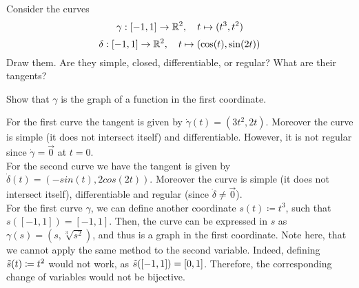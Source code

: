 \documentclass[11pt]{article}
\begin{document}
\begin{exercise}
    Consider the curves 
    \[
        \gamma : [-1,1] \rightarrow \mathbb{R}^2, \quad t \mapsto ( t^3, t^2 )
    \]
    \[
        \delta : [-1,1] \rightarrow \mathbb{R}^2, \quad t \mapsto ( \cos(t), \sin(2t) )
    \]
    Draw them. Are they simple, closed, differentiable, or regular? What are their tangents?
    
    Show that $\gamma$ is the graph of a function in the first coordinate.
\end{exercise}
\begin{solution}    
    For the first curve the tangent is given by $\dot{\gamma}(t) = ( 3t^2, 2t )$.
    Moreover the curve is simple (it does not intersect itself) and differentiable.
	However, it is not regular since $\dot{\gamma} = \vec{0}$ at $t=0$.
    \\

    For the second curve we have the tangent is given by $\dot{\delta}(t) = (-sin(t),2cos(2t))$.
    Moreover the curve is simple (it does not intersect itself), differentiable and regular (since $\dot{\delta} \neq \vec{0}$).\\

    For the first curve $\gamma$, we can define another coordinate $s(t) \coloneqq t^3$, such that $s([-1, 1]) = [-1, 1]$.
    Then, the curve can be expressed in $s$ as $\gamma(s) = (s, \sqrt[3]{s^2})$, and thus is a graph in the first coordinate. Note here, that we cannot apply the same method to the second variable.
    Indeed, defining $\Tilde{s}(t) \coloneqq t^2$ would not work, as $\Tilde{s}([-1, 1]) = [0, 1]$. Therefore, the corresponding change of variables would not be bijective.
\end{solution}
\end{document}
